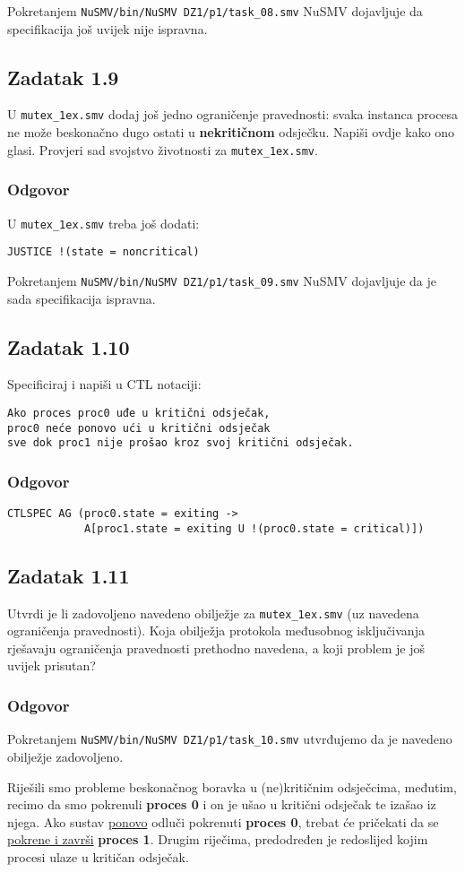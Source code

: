 \documentclass{article}
\newcommand{\zadatak}[1]{\subsection{Zadatak #1}}
\newcommand{\odgovor}{\subsubsection*{Odgovor}}
\newcommand{\code}[1]{\colorbox{blue!11}{\texttt{#1}}}
\begin{document}
\noindent
Pokretanjem \code{NuSMV/bin/NuSMV DZ1/p1/task\_08.smv} NuSMV dojavljuje da specifikacija još uvijek nije ispravna.


\zadatak{1.9}

U \code{mutex\_1ex.smv} dodaj još jedno ograničenje pravednosti: svaka instanca procesa ne može beskonačno dugo ostati u \textbf{nekritičnom} odsječku. Napiši ovdje kako ono glasi. Provjeri sad svojstvo životnosti za \code{mutex\_1ex.smv}.

\odgovor

U \code{mutex\_1ex.smv} treba još dodati:

\begin{verbatim}
JUSTICE !(state = noncritical)
\end{verbatim}

\noindent
Pokretanjem \code{NuSMV/bin/NuSMV DZ1/p1/task\_09.smv} NuSMV dojavljuje da je sada specifikacija ispravna.
\pagebreak  %


\zadatak{1.10}

Specificiraj i napiši u CTL notaciji:

\begin{verbatim}
Ako proces proc0 uđe u kritični odsječak,
proc0 neće ponovo ući u kritični odsječak
sve dok proc1 nije prošao kroz svoj kritični odsječak.
\end{verbatim}

\odgovor

\begin{verbatim}
CTLSPEC AG (proc0.state = exiting ->
            A[proc1.state = exiting U !(proc0.state = critical)])
\end{verbatim}


\zadatak{1.11}

Utvrdi je li zadovoljeno navedeno obilježje za \code{mutex\_1ex.smv} (uz navedena ograničenja pravednosti). Koja obilježja protokola međusobnog isključivanja rješavaju ograničenja pravednosti prethodno navedena, a koji problem je još uvijek prisutan?

\odgovor

Pokretanjem \code{NuSMV/bin/NuSMV DZ1/p1/task\_10.smv} utvrđujemo da je navedeno obilježje zadovoljeno.
\newline

Riješili smo probleme beskonačnog boravka u (ne)kritičnim odsječcima, međutim, recimo da smo pokrenuli \textbf{proces 0} i on je ušao u kritični odsječak te izašao iz njega. Ako sustav \underline{ponovo} odluči pokrenuti \textbf{proces 0}, trebat će pričekati da se \underline{pokrene i završi} \textbf{proces 1}. Drugim riječima, predodređen je redoslijed kojim procesi ulaze u kritičan odsječak.
\pagebreak
\end{document}
